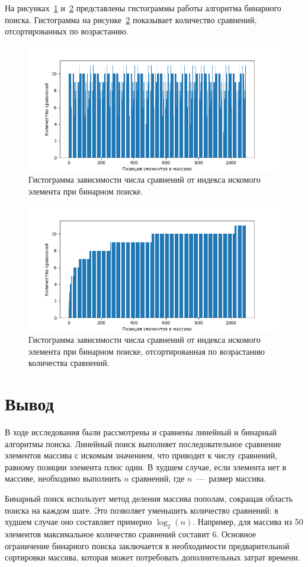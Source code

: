 На рисунках~\ref{fig:Figure_2} и~\ref{fig:Figure_3} представлены гистограммы работы алгоритма бинарного поиска. Гистограмма на рисунке~\ref{fig:Figure_3} показывает количество сравнений, отсортированных по возрастанию.

\begin{figure}[H]
    \centering
    \includegraphics[width=1\textwidth]{images/Figure_2.png}
    \caption{Гистограмма зависимости числа сравнений от индекса искомого элемента при бинарном поиске.}
    \label{fig:Figure_2}
\end{figure}

\begin{figure}[H]
    \centering
    \includegraphics[width=1\textwidth]{images/Figure_3.png}
    \caption{Гистограмма зависимости числа сравнений от индекса искомого элемента при бинарном поиске, отсортированная по возрастанию количества сравнений.}
    \label{fig:Figure_3}
\end{figure}


\section*{Вывод}
В ходе исследования были рассмотрены и сравнены линейный и бинарный алгоритмы поиска. Линейный поиск выполняет последовательное сравнение элементов массива с искомым значением, что приводит к числу сравнений, равному позиции элемента плюс один. В худшем случае, если элемента нет в массиве, необходимо выполнить \( n \) сравнений, где \( n \)~---~размер массива. 

Бинарный поиск использует метод деления массива пополам, сокращая область поиска на каждом шаге. Это позволяет уменьшить количество сравнений: в худшем случае оно составляет примерно \( \log_2(n) \). Например, для массива из 50 элементов максимальное количество сравнений составит 6. Основное ограничение бинарного поиска заключается в необходимости предварительной сортировки массива, которая может потребовать дополнительных затрат времени.